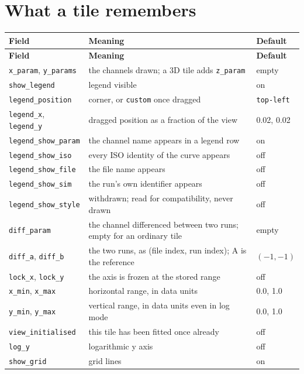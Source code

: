 \documentclass[11pt,a4paper,oneside]{report}
\newcommand{\code}[1]{\texttt{#1}}
\begin{document}
\section{What a tile remembers}

\begin{center}
\small
\begin{longtable}{@{}p{}p{}p{}@{}}
\toprule
\textbf{Field} & \textbf{Meaning} & \textbf{Default} \\
\midrule
\endfirsthead
\toprule
\textbf{Field} & \textbf{Meaning} & \textbf{Default} \\
\midrule
\endhead
\code{x\_param}, \code{y\_params} & the channels drawn; a 3D tile adds \code{z\_param} & empty \\
\code{show\_legend} & legend visible & on \\
\code{legend\_position} & corner, or \code{custom} once dragged & \code{top-left} \\
\code{legend\_x}, \code{legend\_y} & dragged position as a fraction of the view & 0.02, 0.02 \\
\code{legend\_show\_param} & the channel name appears in a legend row & on \\
\code{legend\_show\_iso} & every ISO identity of the curve appears & off \\
\code{legend\_show\_file} & the file name appears & off \\
\code{legend\_show\_sim} & the run's own identifier appears & off \\
\code{legend\_show\_style} & withdrawn; read for compatibility, never drawn & off \\
\code{diff\_param} & the channel differenced between two runs; empty for an ordinary tile & empty \\
\code{diff\_a}, \code{diff\_b} & the two runs, as (file index, run index); A is the reference & $(-1,-1)$ \\
\code{lock\_x}, \code{lock\_y} & the axis is frozen at the stored range & off \\
\code{x\_min}, \code{x\_max} & horizontal range, in data units & 0.0, 1.0 \\
\code{y\_min}, \code{y\_max} & vertical range, in data units even in log mode & 0.0, 1.0 \\
\code{view\_initialised} & this tile has been fitted once already & off \\
\code{log\_y} & logarithmic y axis & off \\
\code{show\_grid} & grid lines & on \\

\end{longtable}
\end{center}
\end{document}
